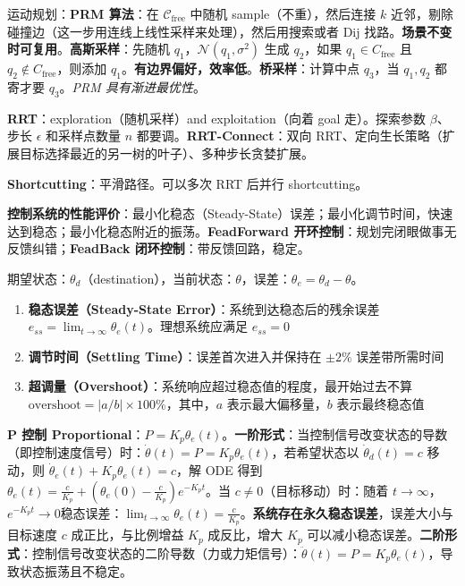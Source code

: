 \documentclass[
  8pt]{extarticle}
\begin{document}
\begin{multicols*}{4}
运动规划：\textbf{PRM 算法}：在 \(\mathcal{C}_{\text{free}}\) 中随机
sample（不重），然后连接 \(k\)
近邻，剔除碰撞边（这一步用连线上线性采样来处理），然后用搜索或者 Dij
找路。\textbf{场景不变时可复用}。\textbf{高斯采样}：先随机
\(q_1\)，\(\mathcal N (q_1, \sigma^2)\) 生成 \(q_2\)，如果
\(q_1 \in C_{\text{free}}\) 且 \(q_2 \notin C_{\text{free}}\)，则添加
\(q_1\)。\textbf{有边界偏好，效率低}。\textbf{桥采样}：计算中点
\(q_3\)，当 \(q_1,q_2\) 都寄才要 \(q_3\)。\emph{PRM 具有渐进最优性}。

\textbf{RRT}：exploration（随机采样）and exploitation（向着 goal
走）。探索参数 \(\beta\)、步长 \(\epsilon\) 和采样点数量 \(n\)
都要调。\textbf{RRT-Connect}：双向
RRT、定向生长策略（扩展目标选择最近的另一树的叶子）、多种步长贪婪扩展。

\textbf{Shortcutting}：平滑路径。可以多次 RRT 后并行 shortcutting。

\textbf{控制系统的性能评价}：最小化稳态（Steady-State）误差；最小化调节时间，快速达到稳态；最小化稳态附近的振荡。\textbf{FeadForward
开环控制}：规划完闭眼做事无反馈纠错；\textbf{FeadBack
闭环控制}：带反馈回路，稳定。

期望状态：\(\theta_d\)（destination），当前状态：\(\theta\)，误差：\(\theta_e = \theta_d - \theta\)。

\begin{enumerate}
\def\labelenumi{\arabic{enumi}.}
\item
  \textbf{稳态误差（Steady-State Error）}：系统到达稳态后的残余误差
  \(e_{ss} = \lim_{t\to\infty} \theta_e(t)\)。理想系统应满足
  \(e_{ss}=0\)
\item
  \textbf{调节时间（Settling Time）}：误差首次进入并保持在 \(\pm 2\%\)
  误差带所需时间
\item
  \textbf{超调量（Overshoot）}：系统响应超过稳态值的程度，最开始过去不算
  \(\text{overshoot} = |a/b| \times 100\%\)，其中，\(a\)
  表示最大偏移量，\(b\) 表示最终稳态值
\end{enumerate}

\textbf{P 控制
Proportional}：\(P = K_p\theta_e(t)\)。\textbf{一阶形式}：当控制信号改变状态的导数（即控制速度信号）时：\(\dot{\theta}(t) = P = K_p\theta_e(t)\)，若希望状态以
\(\dot{\theta}_d(t) = c\) 移动，则
\(\dot{\theta}_e(t) + K_p\theta_e(t) = c\)，解 ODE 得到
\(\theta_e(t) = \frac{c}{K_p} + \left(\theta_e(0) - \frac{c}{K_p}\right)e^{-K_pt}\)。当
\(c\neq0\)（目标移动）时：随着
\(t\rightarrow\infty\)，\(e^{-K_pt}\rightarrow0\)稳态误差：\(\lim_{t\rightarrow\infty}\theta_e(t) = \frac{c}{K_p}\)。\textbf{系统存在永久稳态误差}，误差大小与目标速度
\(c\) 成正比，与比例增益 \(K_p\) 成反比，增大 \(K_p\)
可以减小稳态误差。\textbf{二阶形式}：控制信号改变状态的二阶导数（力或力矩信号）：\(\ddot{\theta}(t) = P = K_p\theta_e(t)\)，导致状态振荡且不稳定。


\end{multicols*}
\end{document}
